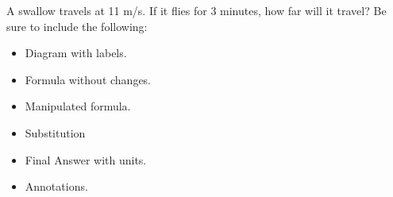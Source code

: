 \documentclass[12pt]{examdesign}
\begin{document}
\begin{shortanswer}[title={Free Response},
	rearrange=no]


\begin{question}
A swallow travels at 11 m/s.  If it flies for 3 minutes, how far will it travel?
Be sure to include the following:
\begin{itemize}
	\item Diagram with labels.
	\item Formula without changes.
	\item Manipulated formula.
	\item Substitution
	\item Final Answer with units.
	\item Annotations.
\end{itemize}

\end{question}



	\end{shortanswer}
\end{document}
